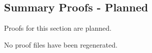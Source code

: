 \subsection*{Summary Proofs - Planned}

\begin{remark*}
Proofs for this section are planned.
\end{remark*}

\begin{remark*}
No proof files have been regenerated.
\end{remark*}
